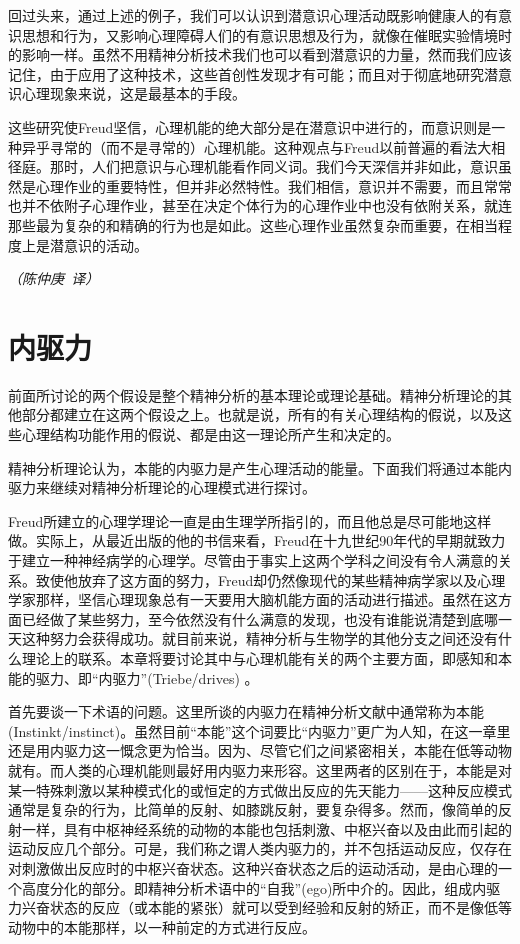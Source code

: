 \documentclass[UTF8,10pt,a4paper,openany]{book}
\newcommand{\signature}[1]{\begin{flushright}\slshape #1\end{flushright}}
\newcommand{\signatureA}{\signature{（陈仲庚~译）}}
\begin{document}
回过头来，通过上述的例子，我们可以认识到潜意识心理活动既影响健康人的有意识思想和行为，又影响心理障碍人们的有意识思想及行为，就像在催眠实验情境时的影响一样。虽然不用精神分析技术我们也可以看到潜意识的力量，然而我们应该记住，由于应用了这种技术，这些首创性发现才有可能；而且对于彻底地研究潜意识心理现象来说，这是最基本的手段。

这些研究使Freud坚信，心理机能的绝大部分是在潜意识中进行的，而意识则是一种异乎寻常的（而不是寻常的）心理机能。这种观点与Freud以前普遍的看法大相径庭。那时，人们把意识与心理机能看作同义词。我们今天深信并非如此，意识虽然是心理作业的重要特性，但并非必然特性。我们相信，意识并不需要，而且常常也并不依附子心理作业，甚至在决定个体行为的心理作业中也没有依附关系，就连那些最为复杂的和精确的行为也是如此。这些心理作业虽然复杂而重要，在相当程度上是潜意识的活动。
\signatureA

\chapter{内驱力}\label{2}

前面所讨论的两个假设是整个精神分析的基本理论或理论基础。精神分析理论的其他部分都建立在这两个假设之上。也就是说，所有的有关心理结构的假说，以及这些心理结构功能作用的假说、都是由这一理论所产生和决定的。

精神分析理论认为，本能的内驱力是产生心理活动的能量。下面我们将通过本能内驱力来继续对精神分析理论的心理模式进行探讨。

Freud所建立的心理学理论一直是由生理学所指引的，而且他总是尽可能地这样做。实际上，从最近出版的他的书信来看，Freud在十九世纪90年代的早期就致力于建立一种神经病学的心理学。尽管由于事实上这两个学科之间没有令人满意的关系。致使他放弃了这方面的努力，Freud却仍然像现代的某些精神病学家以及心理学家那样，坚信心理现象总有一天要用大脑机能方面的活动进行描述。虽然在这方面已经做了某些努力，至今依然没有什么满意的发现，也没有谁能说清楚到底哪一天这种努力会获得成功。就目前来说，精神分析与生物学的其他分支之间还没有什么理论上的联系。本章将要讨论其中与心理机能有关的两个主要方面，即感知和本能的驱力、即“内驱力”(Triebe/drives) 。

首先要谈一下术语的问题。这里所谈的内驱力在精神分析文献中通常称为本能(Instinkt/instinct)。虽然目前“本能”这个词要比“内驱力”更广为人知，在这一章里还是用内驱力这一慨念更为恰当。因为、尽管它们之间紧密相关，本能在低等动物就有。而人类的心理机能则最好用内驱力来形容。这里两者的区别在于，本能是对某一特殊刺激以某种模式化的或恒定的方式做出反应的先天能力——这种反应模式通常是复杂的行为，比简单的反射、如膝跳反射，要复杂得多。然而，像简单的反射一样，具有中枢神经系统的动物的本能也包括刺激、中枢兴奋以及由此而引起的运动反应几个部分。可是，我们称之谓人类内驱力的，并不包括运动反应，仅存在对刺激做出反应时的中枢兴奋状态。这种兴奋状态之后的运动活动，是由心理的一个高度分化的部分。即精神分析术语中的“自我”(ego)所中介的。因此，组成内驱力兴奋状态的反应（或本能的紧张）就可以受到经验和反射的矫正，而不是像低等动物中的本能那样，以一种前定的方式进行反应。
\end{document}
